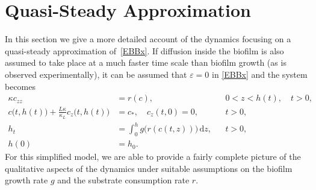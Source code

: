 \documentclass[reqno,11pt]{amsart}
\newtheorem{cor}[thm]{Corollary}
\numberwithin{equation}{section}
\newcommand{\rd}{\mathrm{d}}
\begin{document}

\section{Quasi-Steady Approximation}
In this section we give a more detailed account of the dynamics 
focusing on a quasi-steady approximation of~\eqref{EBBx}. 
If diffusion inside the biofilm is also assumed to take place
at a much faster time scale than biofilm growth (as is observed
experimentally), it can be assumed
that $\varepsilon =0$ in \eqref{EBBx} and the system
becomes
\begin{subequations}
\label{BBx}
\begin{align}
\kappa c_{zz}&= r(c),  &&0<z<h(t),\quad t>0,\label{BBx2}\\
c\bigl(t,h(t)\bigr)+\frac{L\kappa}{\kappa_L}c_z\bigl(t,h(t)\bigr)&=c_*,\quad
c_z(t,0)=0, &&t>0,\label{BBx4}\\
h_t&=\int_0^h g\big(r(c(t,z))\big)\,\rd z,&& t>0,\label{BBx6}\\
h(0)&=h_0.\label{BBx7}
\end{align}
 \end{subequations}
For this simplified model, we are able to provide a fairly complete
picture of the qualitative aspects of the dynamics under suitable
assumptions on the biofilm growth rate $g$ and the substrate
consumption rate $r$.
\end{document}
